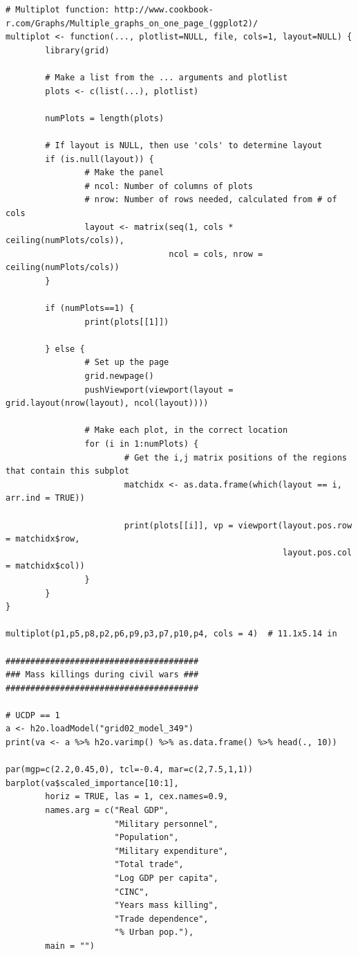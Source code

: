 \begin{verbatim}
# Multiplot function: http://www.cookbook-r.com/Graphs/Multiple_graphs_on_one_page_(ggplot2)/
multiplot <- function(..., plotlist=NULL, file, cols=1, layout=NULL) {
        library(grid)
        
        # Make a list from the ... arguments and plotlist
        plots <- c(list(...), plotlist)
        
        numPlots = length(plots)
        
        # If layout is NULL, then use 'cols' to determine layout
        if (is.null(layout)) {
                # Make the panel
                # ncol: Number of columns of plots
                # nrow: Number of rows needed, calculated from # of cols
                layout <- matrix(seq(1, cols * ceiling(numPlots/cols)),
                                 ncol = cols, nrow = ceiling(numPlots/cols))
        }
        
        if (numPlots==1) {
                print(plots[[1]])
                
        } else {
                # Set up the page
                grid.newpage()
                pushViewport(viewport(layout = grid.layout(nrow(layout), ncol(layout))))
                
                # Make each plot, in the correct location
                for (i in 1:numPlots) {
                        # Get the i,j matrix positions of the regions that contain this subplot
                        matchidx <- as.data.frame(which(layout == i, arr.ind = TRUE))
                        
                        print(plots[[i]], vp = viewport(layout.pos.row = matchidx$row,
                                                        layout.pos.col = matchidx$col))
                }
        }
}

multiplot(p1,p5,p8,p2,p6,p9,p3,p7,p10,p4, cols = 4)  # 11.1x5.14 in

#######################################
### Mass killings during civil wars ###
#######################################

# UCDP == 1
a <- h2o.loadModel("grid02_model_349")
print(va <- a %>% h2o.varimp() %>% as.data.frame() %>% head(., 10)) 

par(mgp=c(2.2,0.45,0), tcl=-0.4, mar=c(2,7.5,1,1))
barplot(va$scaled_importance[10:1],
        horiz = TRUE, las = 1, cex.names=0.9,
        names.arg = c("Real GDP",
                      "Military personnel",
                      "Population",
                      "Military expenditure",
                      "Total trade",
                      "Log GDP per capita",
                      "CINC",
                      "Years mass killing",
                      "Trade dependence",
                      "% Urban pop."),
        main = "")


\end{verbatim}
